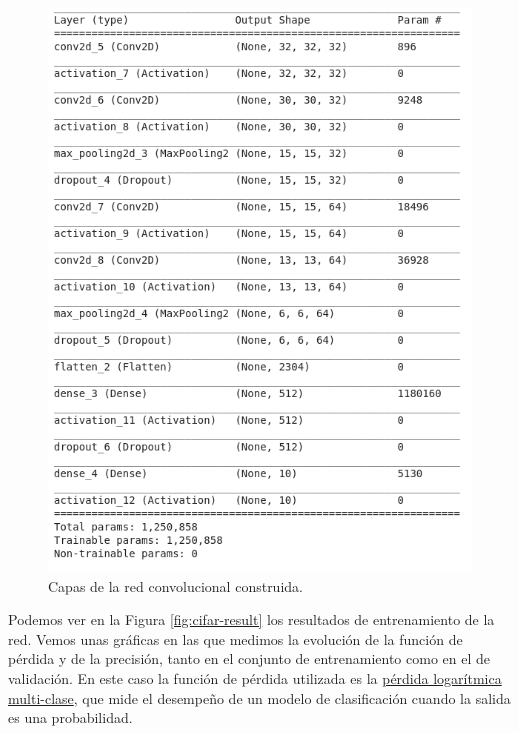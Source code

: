 \documentclass[
  a4paper,
  12pt,
  spanish,
]{scrartcl}
\theoremstyle{teorema-style}
\begin{document}
\begin{figure}[h]
  \centering
  \includegraphics[width=.7\textwidth]{img/model}
  \caption{Capas de la red convolucional construida.}
  \label{fig:model}
\end{figure}

Podemos ver en la Figura \ref{fig:cifar-result} los resultados de entrenamiento de la red. Vemos unas gráficas en las que medimos la evolución de la función de pérdida y de la precisión, tanto en el conjunto de entrenamiento como en el de validación. En este caso la función de pérdida utilizada es la \href{http://wiki.fast.ai/index.php/Log_Loss}{pérdida logarítmica multi-clase}, que mide el desempeño de un modelo de clasificación cuando la salida es una probabilidad.
\end{document}
